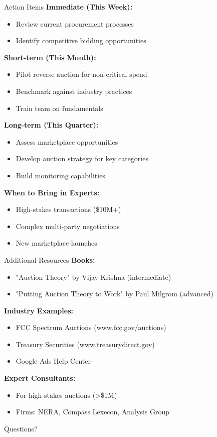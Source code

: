 \documentclass[xcolor={x11names}, aspectratio=169 ]{beamer}
\begin{document}
\begin{frame}{Action Items}
\textbf{Immediate (This Week):}
\begin{itemize}
  \item Review current procurement processes
  \item Identify competitive bidding opportunities
\end{itemize}

\textbf{Short-term (This Month):}
\begin{itemize}
  \item Pilot reverse auction for non-critical spend
  \item Benchmark against industry practices
  \item Train team on fundamentals
\end{itemize}

\textbf{Long-term (This Quarter):}
\begin{itemize}
  \item Assess marketplace opportunities
  \item Develop auction strategy for key categories
  \item Build monitoring capabilities
\end{itemize}

\textbf{When to Bring in Experts:}
\begin{itemize}
  \item High-stakes transactions (\$10M+)
  \item Complex multi-party negotiations
  \item New marketplace launches
\end{itemize}
\end{frame}

\begin{frame}{Additional Resources}
\textbf{Books:}
\begin{itemize}
  \item "Auction Theory" by Vijay Krishna (intermediate)
  \item "Putting Auction Theory to Work" by Paul Milgrom (advanced)
\end{itemize}

\textbf{Industry Examples:}
\begin{itemize}
  \item FCC Spectrum Auctions (www.fcc.gov/auctions)
  \item Treasury Securities (www.treasurydirect.gov)
  \item Google Ads Help Center
\end{itemize}

\textbf{Expert Consultants:}
\begin{itemize}
  \item For high-stakes auctions (>\$1M)
  \item Firms: NERA, Compass Lexecon, Analysis Group
\end{itemize}

\begin{center}
\Large Questions?
\end{center}
\end{frame}
\end{document}
